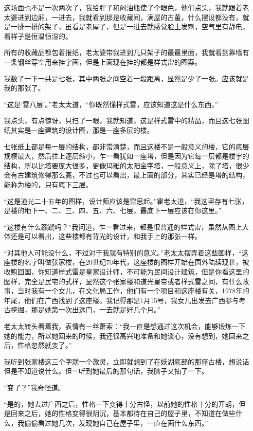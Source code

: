 这场面也不是一次两次了，我给胖子和闷油瓶使了个眼色，他们点头，我就跟着老太婆进到边厢，一进去，我就看到那是收藏间，满屋的古董，什么摆设都没有，就是一排一排的架子，虽看是老屋子，但是一进去就感觉脸上发刺，空气里有静电，看样子是恒温恒湿的。

所有的收藏品都包着报纸，老太婆带我进到几只架子的最最里面，我就看到靠墙有一条钢丝穿空用来挂字画，但是上面现在挂的都是样式雷的图案。

我数了一下一共是七张，其中两张之间空着一段距离，显然是少了一张。应该就是我的那张了。

“这是‘雷八层’。”老太太道，“你既然懂样式雷，应该知道这是什么东西。”

我点头，有点惊讶，只扫了一眼，我就知道，这是样式雷中的精品，而且这七张图纸其实是一座建筑的设计图，那是一座多层的楼。

七张纸上都是每一层的结构，都非常清楚，而且这楼不是一般意义的楼，它的底层规模最大，然后往上逐层缩小，乍一看犹如一座塔，但是因为它每一层都是楼宇的结构，所以比塔要庞大很多，更像玛雅的太阳金字塔，一般意义上，除了塔，很少会有古建筑修得那么高，不过也可以看出，最上面的部分，其实已经是塔的结构，能称为楼的，只有底下三层。

“这是道光二十五年的图样，设计师应该是雷思起。”霍老太道，“我这里存有七张，是楼的地下一、二、三、四、五、六、七层，最底下一层应该在你这里。”

“这楼有什么蹊跷吗？”我问道，乍一看过来，都是很普通的样式雷，虽然从图上大体还是可以看出，这些楼都有背光的设计，和我手上的那张一样。

“对其他人可能没什么，不过对于我就有特别的意义。”老太太摆弄着这些图样，“这座楼的名字叫做张家楼，在20世纪70年代，这座楼的图样开始在国外陆续现世，被收购回国，你知道样式雷是皇家设计师，不可能为民间设计建筑，但是你看这里的图样，完全是民宅的式样，显然这个张家楼和道光皇帝或者样式雷之间，有什么故事，当时我有一个女儿，在文化局工作，他们有一个项目和这座楼有关，1978年的年尾，他们在广西找到了这座楼。我记得那是1月15号，我女儿出发去广西参与考古挖掘，那是她第一次出远门，一去就是好几个月。”

老太太转头看着我，表情有一丝萧索：“我一直是想通过这次机会，能够锻炼一下她的能力，所以她回来的时候，我还很高兴地准备和她谈心，没有想到，她回来之后，性格忽然就变了。”

我听到张家楼这三个字就一个激灵，立即就想到了在妖湖底部的那座古楼，想说话但是不知道说什么。但一听到她最后的那句话，我脑子又抽了一下。

“变了？”我奇怪道。

“是的，她去过广西之后，性格一下变得十分古怪，以前她的性格十分的开朗，但是回来之后，她的性格变得很阴沉，基本都待在自己的屋子里，不知道在做些什么，我偷偷看过她几次，发现她自己在屋子里，一直在画什么东西。”

